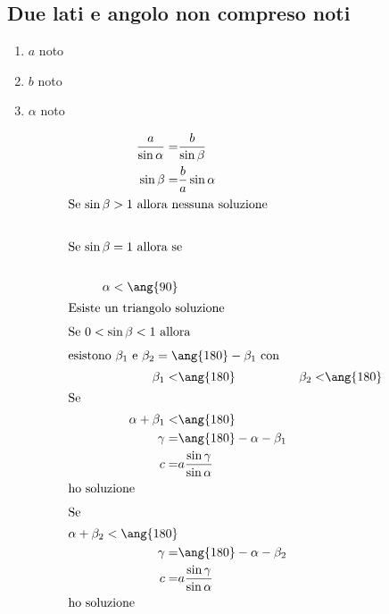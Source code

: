 \subsection{Due lati e angolo non compreso noti}
\begin{enumerate}
	\item $a$ noto
	\item $b$ noto
	\item $\alpha$ noto
\end{enumerate}
\begin{align*}
\frac{a}{\sin\alpha}=&\frac{b}{\sin\beta}\\
\sin\beta=&\frac{b}{a}\sin\alpha\\
\intertext{Se $\sin\beta>1$ allora nessuna soluzione}\\
\intertext{Se $\sin\beta=1$ allora se }\\
\alpha<\ang{90}\\
\intertext{Esiste un triangolo soluzione}
\intertext{Se $0<\sin\beta<1$ allora}
\intertext{esistono $\beta_1$ e $\beta_2=\ang{180}-\beta_1$ con}
\beta_1<&\ang{180}&\beta_2<&\ang{180}\\
\intertext{Se}
\alpha+\beta_1<&\ang{180}\\
\gamma=&\ang{180}-\alpha-\beta_1\\
c=&a\frac{\sin\gamma}{\sin\alpha}\\
\intertext{ho soluzione}
\intertext{Se}
\alpha+\beta_2<\ang{180}\\
\gamma=&\ang{180}-\alpha-\beta_2\\
c=&a\frac{\sin\gamma}{\sin\alpha}\\
\intertext{ho soluzione}
\end{align*}